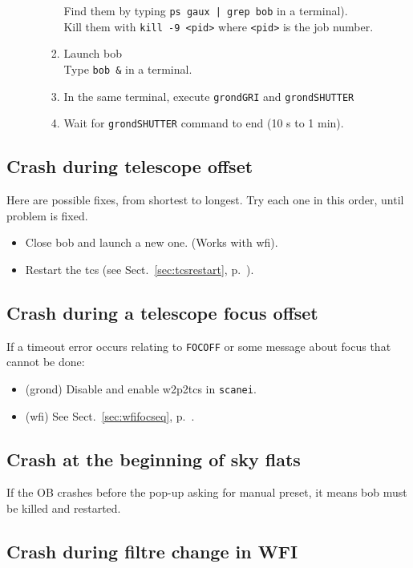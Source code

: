 \documentclass[11pt,fleqn]{book}
\def\secref#1{Sect.~\ref{sec:#1}, p.~\pageref{sec:#1}}
\begin{document}
\begin{enumerate}
\begin{enumerate}
\begin{enumerate}
                   Find them by typing \texttt{ps gaux | grep bob} in a terminal).\\
                   Kill them with \texttt{kill -9 <pid>} where \texttt{<pid>} is the job number.
             \item Launch \gls{bob}\\  
                   Type \texttt{bob \&} in a terminal.
             \item In the same terminal, execute \texttt{grondGRI} and \texttt{grondSHUTTER}
             \item Wait for \texttt{grondSHUTTER} command to end (10 s to 1 min).
             \end{enumerate}
  \end{enumerate}
\end{enumerate}

\subsection{Crash during telescope offset}

Here are possible fixes, from shortest to longest.  Try each one in this
order, until problem is fixed.
\begin{itemize}
  \item Close \gls{bob} and launch a new one. (Works with \gls{wfi}).
  \item Restart the \gls{tcs} (see \secref{tcsrestart}).
\end{itemize}

\subsection{Crash during a telescope focus offset}
If a timeout error occurs relating to \texttt{FOCOFF} or some message about
focus that cannot be done:
\begin{itemize}
  \item (\gls{grond}) Disable and enable w2p2tcs in \texttt{scanei}.
  \item (\gls{wfi}) See \secref{wfifocseq}.
\end{itemize}

\subsection{Crash at the beginning of sky flats}
If the OB crashes before the pop-up asking for manual preset, it means
bob must be killed and restarted.

\subsection{Crash during filtre change in WFI}
\label{sec:crashfiltre}
\end{document}
